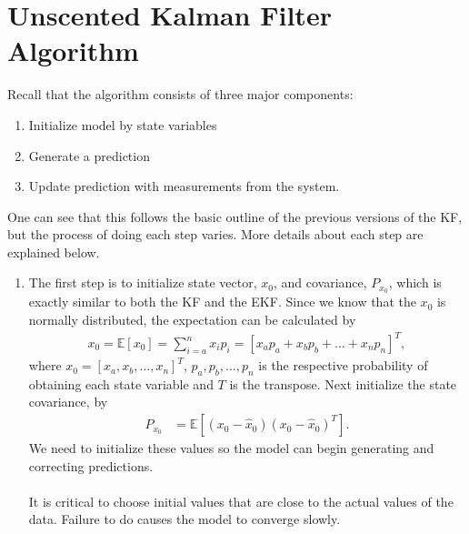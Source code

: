 \section{Unscented Kalman Filter Algorithm}
\noindent Recall that the algorithm consists of three major components:
\begin{enumerate}
  \item Initialize model by state variables
  \item Generate a prediction
  \item Update prediction with measurements from the system.
\end{enumerate}
One can see that this follows the basic outline of the previous versions of the KF, but the process of doing each step varies. More details about each step are explained below.

\begin{enumerate}
    \item The first step is to initialize state vector, $x_0$, and covariance, $P_{x_0}$, which is exactly similar to both the KF and the EKF. Since we know that the $x_0$ is normally distributed, the expectation can be calculated by
    \begin{align*}
    	x_0 = \mathbb{E}[x_0]   = \sum^n_{i = a} x_i p_i = [x_a p_a + x_b p_b + \hdots + x_n p_n]^T,
    \end{align*}
   where $x_0= [x_a, x_b, \hdots, x_n]^T$, $p_a, p_b, \hdots, p_n$  is the respective probability of obtaining each state variable and $T$ is the transpose. Next initialize the state covariance, by
    \begin{align*}
        P_{x_{0}} &= \mathbb{E}[(x_{0}-\hat{x}_{0})(x_{0}-\hat{x}_{0})^{T}].
    \end{align*}
\noindent We need to initialize these values so the model can begin generating and correcting predictions. \\ \\
    It is critical to choose initial values that are close to the actual values of the data. Failure to do causes the model to converge slowly.
    

\end{enumerate}
